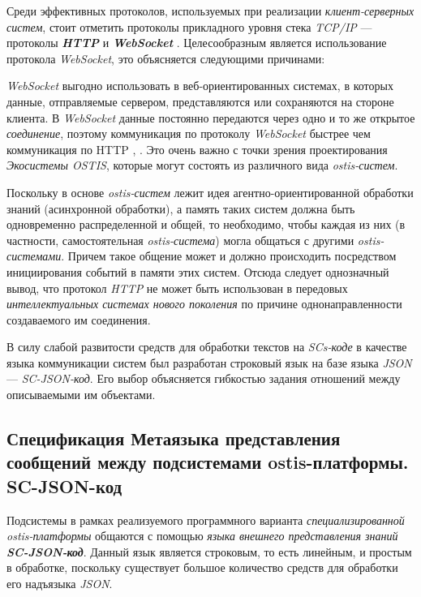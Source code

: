 Среди эффективных протоколов, используемых при реализации \textit{клиент-серверных систем}, стоит отметить протоколы прикладного уровня стека \textit{TCP/IP} --- протоколы \textbf{\textit{HTTP}} и \textbf{\textit{WebSocket}} . Целесообразным является использование протокола \textit{WebSocket}, это объясняется следующими причинами:

\begin{textitemize}
    \item \textit{WebSocket} выгодно использовать в веб-ориентированных системах, в которых данные, отправляемые сервером, представляются или сохраняются на стороне клиента. В \textit{WebSocket} данные постоянно передаются через одно и то же открытое \textit{соединение}, поэтому коммуникация по протоколу \textit{WebSocket} быстрее чем коммуникация по HTTP , . Это очень важно с точки зрения проектирования \textit{Экосистемы OSTIS}, которые могут состоять из  различного вида \textit{ostis-систем}.
    \item Поскольку в основе \textit{ostis-систем} лежит идея агентно-ориентированной обработки знаний (асинхронной обработки), а память таких систем должна быть одновременно распределенной и общей, то необходимо, чтобы каждая из них (в частности, самостоятельная \textit{ostis-система}) могла общаться с другими \textit{ostis-системами}. Причем такое общение может и должно происходить посредством инициирования событий в памяти этих систем. Отсюда следует однозначный вывод, что протокол \textit{HTTP} не может быть использован в передовых \textit{интеллектуальных системах нового поколения} по причине однонаправленности создаваемого им соединения.
\end{textitemize}

В силу слабой развитости средств для обработки текстов на \textit{SCs-коде} в качестве языка коммуникации систем был разработан строковый язык на базе языка \textit{JSON}  --- \textit{SC-JSON-код}. Его выбор объясняется гибкостью задания отношений между описываемыми им объектами.

\subsection{Спецификация Метаязыка представления сообщений между подсистемами ostis-платформы. SC-JSON-код}
\label{sec_soft_platform_sc_json_code}

Подсистемы в рамках реализуемого программного варианта \textit{специализированной ostis-платформы} общаются с помощью \textit{языка внешнего представления знаний} \textbf{\textit{SC-JSON-код}}. Данный язык является строковым, то есть линейным, и простым в обработке, поскольку существует большое количество средств для обработки его надъязыка \textit{JSON}.

